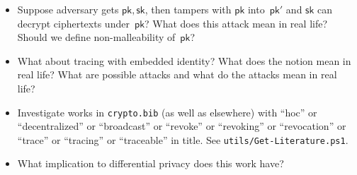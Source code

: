 \begin{itemize}
\item Suppose adversary gets $\mathsf{pk},\mathsf{sk}$, then tampers with $\mathsf{pk}$ into~$\mathsf{pk}'$ and $\mathsf{sk}$ can decrypt ciphertexts under~$\mathsf{pk}$?
What does this attack mean in real life?
Should we define non-malleability of~$\mathsf{pk}$?
\item What about tracing with embedded identity?
What does the notion mean in real life?
What are possible attacks and what do the attacks mean in real life?
\item Investigate works in \texttt{crypto.bib} (as well as elsewhere) with ``\ad hoc'' or ``decentralized'' or ``broadcast'' or ``revoke'' or ``revoking'' or ``revocation'' or ``trace'' or ``tracing'' or ``traceable'' in title.
See \texttt{utils/Get-Literature.ps1}.
\item What implication to differential privacy does this work have?
\end{itemize}
